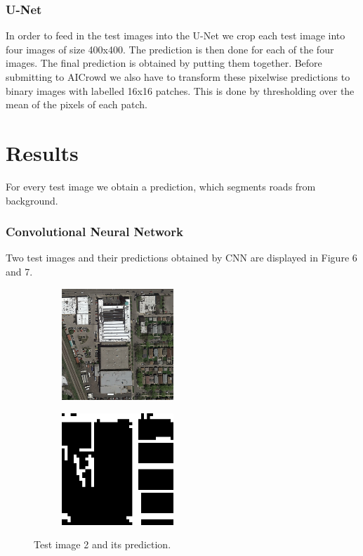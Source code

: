\documentclass[10pt,conference,compsocconf]{IEEEtran}
\begin{document}
\subsubsection{U-Net}
In order to feed in the test images into the U-Net we crop each test image into four images of size 400x400. The prediction is then done for each of the four images. The final prediction is obtained by putting them together. Before submitting to AICrowd we also have to transform these pixelwise predictions to binary images with labelled 16x16 patches. This is done by thresholding over the mean of the pixels of each patch. 

\vspace{0.5cm}
\section{Results}
\vspace{0.3cm}
For every test image we obtain a prediction, which segments roads from background.\\
\subsubsection{Convolutional Neural Network}
Two test images and their predictions obtained by CNN are displayed in Figure 6 and 7.

\begin{figure}[htbp]
	\centering
	\begin{subfigure}[htb]{0.2\textwidth}
		\includegraphics[width=4.2cm]{images/visualize_pred/images/test_2.png}
		\label{fig:test2}
	\end{subfigure}
	\hspace{1.5em}
	\begin{subfigure}[htb]{0.2\textwidth}
		\includegraphics[width=4.2cm]{images/visualize_pred/groundtruth/pred_2.png}
		\label{fig:pred2}
	\end{subfigure}
	\caption{Test image 2 and its prediction.}
\end{figure}
\end{document}

